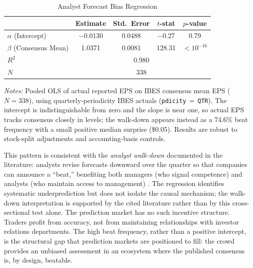 \documentclass[11pt]{article}
\begin{document}
\begin{table}[htbp]
\centering
\begin{threeparttable}
\caption{Analyst Forecast Bias Regression}
\label{tab:bias_reg}
\begin{tabular}{lcccc}
\toprule
& Estimate & Std.\ Error & $t$-stat & $p$-value \\
\midrule
$\alpha$ (Intercept) & $-$0.0130 & 0.0488 & $-$0.27 & 0.79 \\
$\beta$ (Consensus Mean) & 1.0371 & 0.0081 & 128.31 & $<10^{-16}$ \\
\midrule
$R^2$ & \multicolumn{4}{c}{0.980} \\
$N$ & \multicolumn{4}{c}{338} \\
\bottomrule
\end{tabular}
\begin{tablenotes}
\small
\item \textit{Notes:} Pooled OLS of actual reported EPS on IBES consensus mean EPS ($N = 338$), using quarterly-periodicity IBES actuals (\texttt{pdicity}\,$=$\,\texttt{QTR}). The intercept is indistinguishable from zero and the slope is near one, so actual EPS tracks consensus closely in levels; the walk-down appears instead as a 74.6\% beat frequency with a small positive median surprise (\$0.05). Results are robust to stock-split adjustments and accounting-basis controls.
\end{tablenotes}
\end{threeparttable}
\end{table}

This pattern is consistent with the \textit{analyst walk-down} documented in the literature: analysts revise forecasts downward over the quarter so that companies can announce a ``beat,'' benefiting both managers (who signal competence) and analysts (who maintain access to management) \citep{richardson2004walk, matsumoto2002management, ke2006effect}. The regression identifies systematic underprediction but does not isolate the causal mechanism; the walk-down interpretation is supported by the cited literature rather than by this cross-sectional test alone. The prediction market has no such incentive structure. Traders profit from accuracy, not from maintaining relationships with investor relations departments. The high beat frequency, rather than a positive intercept, is the structural gap that prediction markets are positioned to fill: the crowd provides an unbiased assessment in an ecosystem where the published consensus is, by design, beatable.
\end{document}
